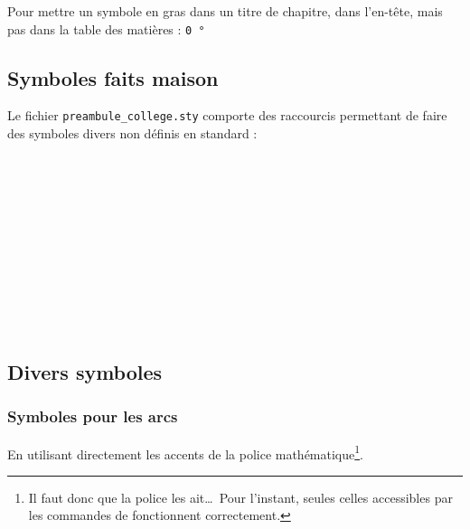 Pour mettre un symbole en gras dans un titre de chapitre, dans l'en-tête, mais pas dans la table des matières : \texttt{{\boldmath\SI[detect-weight]{0}{\degree}}}



\vspace*{\topsep}
\subsection{Symboles faits maison}

Le fichier \texttt{preambule_college.sty} comporte des raccourcis permettant de faire des symboles divers non définis en standard :
\begin{LTXexample}[pos=o,width=.3]
\nRe                \\%
\nsubset            \\%
\nbot               \\%
\nLeftrightarrow	\\%
\vide               \\%
\ie                 \\%
\de                 \\%
\Hyp                \\%
\The                \\%
\Dem                \\%
\nondef				  %
\end{LTXexample}



\subsection{Divers symboles}


\subsubsection{Symboles pour les arcs}

En utilisant directement les accents de la police mathématique\footnote{Il faut donc que la police les ait\dots \ Pour l'instant, seules celles accessibles par les commandes \inlatex{\mathversion} de  fonctionnent correctement.}.

